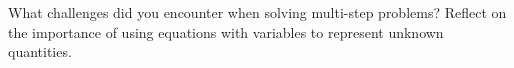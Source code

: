 \documentclass[12pt]{article}
\begin{document}
\vspace{1em}

\begin{tcolorbox}[colframe=black!60, colback=white, 
coltitle=black, colbacktitle=black!15, fonttitle=\bfseries\Large, 
title=Reflection, halign title=center, left=10pt, right=10pt, top=10pt, bottom=90pt]
 What challenges did you encounter when solving multi-step problems? Reflect on the importance of using equations with variables to represent unknown quantities.
\end{tcolorbox}
\end{document}
